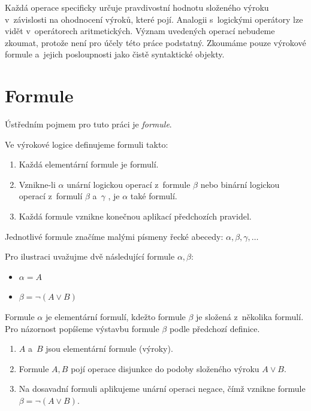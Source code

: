 \documentclass[thesis=B,czech,hidelinks]{thesis}[2012/06/26]
\begin{document}
Každá operace specificky určuje pravdivostní hodnotu složeného výroku v~závislosti na ohodnocení výroků, které pojí. Analogii s~logickými operátory lze vidět v~operátorech aritmetických. Význam uvedených operací nebudeme zkoumat, protože není pro účely této práce podstatný. Zkoumáme pouze výrokové formule a~jejich posloupnosti jako čistě syntaktické objekty.

\section{Formule}

Ústředním pojmem pro tuto práci je \emph{formule}.

\begin{dfn}
Ve výrokové logice definujeme formuli takto:
\begin{enumerate}
	\item Každá elementární formule je formulí.
	\item Vznikne-li $\alpha$ unární logickou operací z~formule $\beta$ nebo binární logickou operací z~formulí $\beta$ a~$\gamma$ , je $\alpha$ také formulí.
	\item Každá formule vznikne konečnou aplikací předchozích pravidel.
\end{enumerate}
\end{dfn}

Jednotlivé formule značíme malými písmeny řecké abecedy: $\alpha , \beta , \gamma , \ldots$

\begin{exm}
Pro ilustraci uvažujme dvě následující formule $\alpha, \beta$:
\begin{itemize}
	\item $\alpha = A$
	\item $\beta = \neg (A \vee B)$
\end{itemize}
Formule $\alpha$ je elementární formulí, kdežto formule $\beta$ je složená z~několika formulí. Pro názornost popíšeme výstavbu formule $\beta$ podle předchozí definice.
\begin{enumerate}
	\item $A$ a~$B$ jsou elementární formule (výroky).
	\item Formule $A, B$ pojí operace disjunkce do podoby složeného výroku $A \vee B$.
	\item Na dosavadní formuli aplikujeme unární operaci negace, čímž vznikne formule $\beta = \neg (A \vee B)$.
\end{enumerate}
\end{exm}
\end{document}
